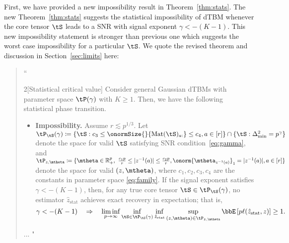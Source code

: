 \documentclass[11pt]{article}
\theoremstyle{definition}
\theoremstyle{definition}
\begin{document}
\begin{enumerate}
\begin{enumerate}[wide]
    First, we have provided a new impossibility result in Theorem~\ref{thm:stats}. The new Theorem~\ref{thm:stats} suggests the statistical impossibility of dTBM whenever the core tensor $\tS$ leads to a SNR with signal exponent $\gamma < -(K-1)$. This new impossibility statement is stronger than previous one which suggests the worst case impossibility for a particular $\tS$. We quote the revised theorem and discussion in Section~\ref{sec:limits} here:
    
    \begin{quote}
    ``
    \begin{customthm}{2}[Statistical critical value]  Consider general Gaussian dTBMs with parameter space $\tP(\gamma)$ with $K\geq 1$. Then, we have the following statistical phase transition. 
    \begin{itemize}[wide]
    \item 
    \textbf{Impossibility.} Assume $r\lesssim p^{1/3}$. Let $\tP_{\tS}(\gamma) \coloneqq \{ \tS: c_3\leq \onormSize{}{\text{Mat}(\tS)_{a:}}\leq c_4, a\in[r]\} \cap \{ \tS: \Delta_{\min}^2 = p^{\gamma}\}$ denote the space for valid $\tS$ satisfying SNR condition~\eqref{eq:gamma}, and $\tP_{z ,\mtheta} \coloneqq \{ \mtheta\in\mathbb{R}^p_{+},\ 
{c_1p\over r}\leq |z^{-1}(a)|\leq {c_2 p\over r}, \onorm{\mtheta_{z^{-1}(a)}}_1=|z^{-1}(a)|, a \in [r] \}$ denote the space for valid $(z, \mtheta)$,  where $c_1, c_2, c_3, c_4$ are the constants in parameter space \eqref{eq:family}. If the signal exponent satisfies $\gamma < -(K-1)$, then, for any true core tensor $\tS \in \tP_{\tS}(\gamma)$, no estimator $\hat z_{\text{stat}}$ achieves exact recovery in expectation; that is,
    \begin{equation}
  \gamma< -(K-1) \quad \Rightarrow  \quad \liminf_{p \rightarrow \infty}\inf_{\tS \in  \tP_{\tS}(\gamma)}  \inf_{\hat z_{\text{stat}}}\sup_{ (z, \mtheta) \in \tP_{z, \mtheta}} \bbE \left[ p\ell(\hat z_{\text{stat}}, z) \right]\geq 1.
\end{equation}
\end{itemize}
    \end{customthm} ... "
    \end{quote}
    

\end{enumerate}
\end{enumerate}
\end{document}

